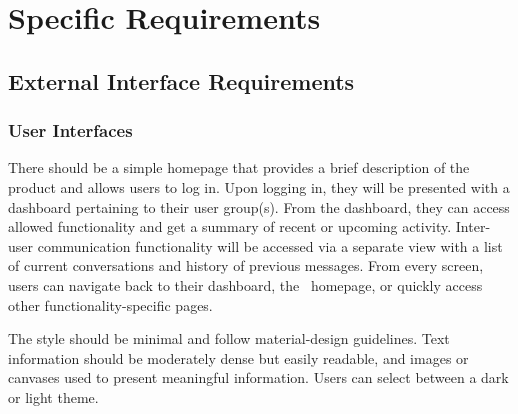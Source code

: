 
\section{Specific Requirements}\label{sec:specific-requirements}
    \subsection{External Interface Requirements}\label{sec:external-interface-requirements}
        \subsubsection{User Interfaces}\label{sec:user-interfaces}
            There should be a simple homepage that provides a brief description of the product and allows users to log in. Upon logging in, they will be presented with a dashboard pertaining to their user group(s). From the dashboard, they can access allowed functionality and get a summary of recent or upcoming activity. Inter-user communication functionality will be accessed via a separate view with a list of current conversations and history of previous messages. From every screen, users can navigate back to their dashboard, the \projectName\ homepage, or quickly access other functionality-specific pages.
            \par The style should be minimal and follow \gls{material-design} guidelines. Text information should be moderately dense but easily readable, and images or canvases used to present meaningful information. Users can select between a dark or light theme.
